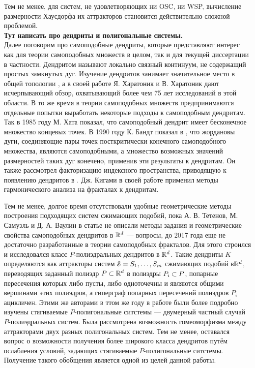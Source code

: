Тем не менее, для систем, не удовлетворяющих ни OSC, ни WSP, вычисление размерности Хаусдорфа их аттракторов становится действительно сложной проблемой.\\

{\bf Тут написать про дендриты и полигональные системы.}\\
Далее поговорим про самоподобные дендриты, которые представляют интерес как для теории самоподобных множеств в целом, так и для текущей диссертации в частности.
Дендритом называют локально связный континуум, не содержащий простых замкнутых дуг.
Изучение дендритов занимает значительное место в общей топологии \cite{Kur1, whyburn1948antop}, а в своей работе \cite{Char} Я. Харатоник и В. Харатоник дают исчерпывающий обзор, охватывающий более чем 75 лет исследований в этой области.
В то же время в теории самоподобных множеств предпринимаются отдельные попытки выработать некоторые подходы к самоподобным дендритам.
Так в 1985 году М. Хата \cite{Hata1985}  показал, что самоподобный дендрит имеет бесконечное множество концевых точек.
В 1990 году К. Бандт показал в \cite{SSS6}, что жордановы дуги, соединяющие пары точек посткритически конечного самоподобного множества, являются самоподобными, а множество возможных значений размерностей таких дуг конечено, применив эти результаты к дендритам.
Он также рассмотрел факторизацию индексного пространства, приводящую к появлению дендритов в \cite{SSS2}.
Дж. Кигами в своей работе \cite{Kig95} применил методы гармонического анализа на фракталах к дендритам. 

Тем не менее, долгое время отсутствовали удобные геометрические методы построения подходящих систем сжимающих подобий, пока А. В. Тетенов, М. Самуэль и Д. А. Ваулин в статье \cite{TSV2017} не описали методы задания и геометрические свойства самоподобных дендритов в $\mathbb{R}^d$ --- вопросы, до 2017 года еще не достаточно разработанные в теории самоподобных фракталов. 
Для этого строился и исследовался класс $P$-полиэдральных дендритов в $\mathbb{R}^d$. 
Такие дендриты $K$ определяются как аттракторы систем ${\EuScript S} = {S_1,\ldots, S_m}$ сжимающих подобий в$\mathbb{R}^d$, переводящих заданный полиэдр $P \subset \mathbb{R}^d$ в полиэдры $P_i \subset P$, попарные пересечения которых либо пусты, либо одноточечны и являются общими вершинами этих полиэдров, а гиперграф попарных пересечений полиэдров $P_i$ ацикличен.
Этими же авторами в ттом же году в работе \cite{STV2017} были более подробно изучены стягиваемые $P$-полигональные ситстемы --- двумерный частный случай $P$-полиэдральных систем.
Была рассмотрена возможность гомеоморфизма между аттракторами двух разных полигональных систем.
Тем не менее, оставался вопрос о возможности получения более широкого класса дендритов путём ослабления условий, задающих стягиваемые $P$-полигональные ситстемы. 
Получение такого обобщения является одной из целей данной работы.

